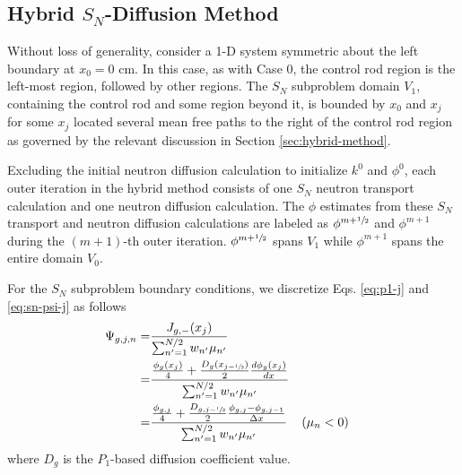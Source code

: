 \subsection{Hybrid $S_N$-Diffusion Method}

Without loss of generality, consider a 1-D system symmetric about the left boundary at $x_0=0$ cm.
In this case, as with Case 0, the control rod region is the left-most region, followed by other
regions. The $S_N$ subproblem domain $V_1$, containing the control rod and some region beyond it,
is bounded by $x_0$ and $x_j$ for some $x_j$
located several mean free paths to the right of the control rod region as governed by the relevant
discussion in Section \ref{sec:hybrid-method}.

Excluding the initial neutron diffusion calculation to initialize $k^0$ and $\phi^0$, each outer
iteration in the hybrid method consists of one $S_N$ neutron transport calculation and one neutron
diffusion calculation. The $\phi$ estimates from these $S_N$ transport and neutron diffusion
calculations are labeled as $\phi^{m+\sfrac{1}{2}}$ and $\phi^{m+1}$ during the
$(m+1)$-th outer iteration. $\phi^{m+\sfrac{1}{2}}$ spans $V_1$ while $\phi^{m+1}$ spans
the entire domain $V_0$.

For the $S_N$ subproblem boundary conditions, we discretize Eqs. \ref{eq:p1-j} and
\ref{eq:sn-psi-j} as follows
%
\begin{align}
  \Psi_{g,j,n} =& \frac{J_{g,-}(x_j)}{\sum^{N/2}_{n'=1}w_{n'}\mu_{n'}} \nonumber \\
  =& \frac{\frac{\phi_g(x_j)}{4}+
  \frac{D_g(x_{j-\sfrac{1}{2}})}{2}\frac{d\phi_g(x_j)}{dx}}{\sum^{N/2}_{n'=1}w_{n'}\mu_{n'}}
  \nonumber \\
  =& \frac{\frac{\phi_{g,j}}{4}+
  \frac{D_{g,j-\sfrac{1}{2}}}{2}\frac{\phi_{g,j}-\phi_{g,j-1}}{\Delta x}}
    {\sum^{N/2}_{n'=1}w_{n'}\mu_{n'}} && (\mu_n < 0) \label{eq:sn-bc}
\end{align}
%
where $D_g$ is the $P_1$-based diffusion coefficient value.

